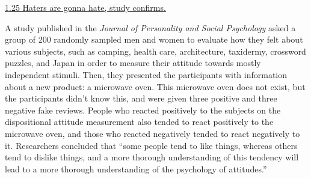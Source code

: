 \documentclass[10pt,letterpaper,unboxed,cm]{exam}
\begin{document}
\begin{questions}



	\question \underline{1.25 Haters are gonna hate, study confirms.}

    A study published in the {\it Journal of Personality and Social Psychology} asked a group of 200 randomly sampled men and women to evaluate how they felt about various subjects, such as camping, health care, architecture, taxidermy, crossword puzzles, and Japan in order to measure their attitude towards mostly independent stimuli. Then, they presented the participants with information about a new product: a microwave oven. This microwave oven does not exist, but the participants didn’t know this, and were given three positive and three negative fake reviews. People who reacted positively to the subjects on the dispositional attitude measurement also tended to react positively to the microwave oven, and those who reacted negatively tended to react negatively to it. Researchers concluded that “some people tend to like things, whereas others tend to dislike things, and a more thorough understanding of this tendency will lead to a more thorough understanding of the psychology of attitudes.”
    

\end{questions}
\end{document}
